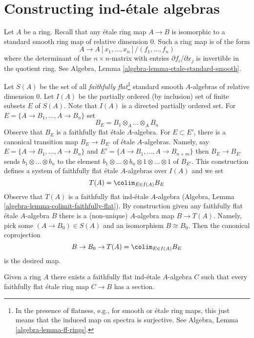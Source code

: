 \section{Constructing ind-\'etale algebras}
\label{section-construction-ind-etale}

\noindent
Let $A$ be a ring. Recall that any \'etale ring map $A \to B$ is isomorphic
to a standard smooth ring map of relative dimension $0$. Such a ring map
is of the form
$$
A \longrightarrow A[x_1, \ldots, x_n]/(f_1, \ldots, f_n)
$$
where the determinant of the $n \times n$-matrix with entries
$\partial f_i/\partial x_j$ is invertible in the quotient ring. See
Algebra, Lemma \ref{algebra-lemma-etale-standard-smooth}.

\medskip\noindent
Let $S(A)$ be the set of all {\it faithfully flat}\footnote{In the presence
of flatness, e.g., for smooth or \'etale ring maps,
this just means that the induced map on spectra is surjective. See
Algebra, Lemma \ref{algebra-lemma-ff-rings}.}
standard smooth $A$-algebras of relative dimension $0$.
Let $I(A)$ be the partially ordered (by inclusion) set of finite
subsets $E$ of $S(A)$. Note that $I(A)$ is a directed partially
ordered set. For $E = \{A \to B_1, \ldots, A \to B_n\}$ set
$$
B_E = B_1 \otimes_A \ldots \otimes_A B_n
$$
Observe that $B_E$ is a faithfully flat \'etale $A$-algebra.
For $E \subset E'$, there is a canonical transition map $B_E \to B_{E'}$
of \'etale $A$-algebras. Namely, say $E = \{A \to B_1, \ldots, A \to B_n\}$
and $E' = \{A \to B_1, \ldots, A \to B_{n + m}\}$ then
$B_E \to B_{E'}$ sends $b_1 \otimes \ldots \otimes b_n$ to the
element $b_1 \otimes \ldots \otimes b_n \otimes 1 \otimes \ldots \otimes 1$
of $B_{E'}$. This construction defines a system of faithfully flat
\'etale $A$-algebras over $I(A)$ and we set
$$
T(A) = \colim_{E \in I(A)} B_E
$$
Observe that $T(A)$ is a faithfully flat ind-\'etale $A$-algebra
(Algebra, Lemma \ref{algebra-lemma-colimit-faithfully-flat}). By construction
given any faithfully flat \'etale $A$-algebra $B$ there is a (non-unique)
$A$-algebra map $B \to T(A)$. Namely, pick some $(A \to B_0) \in S(A)$
and an isomorphism $B \cong B_0$. Then the canonical coprojection
$$
B \to B_0 \to 
T(A) = \colim_{E \in I(A)} B_E
$$
is the desired map.

\begin{lemma}
\label{lemma-first-construction}
Given a ring $A$ there exists a faithfully flat ind-\'etale $A$-algebra $C$
such that every faithfully flat \'etale ring map $C \to B$ has a section.
\end{lemma}

